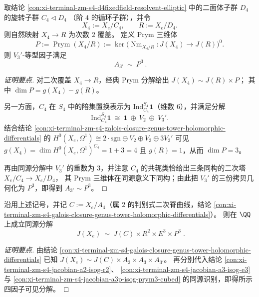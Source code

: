 \begin{conclusion}\label{con:xi-terminal-zm-s4-jacobian-a3p-isog-prym3-cubed}
取结论 \ref{con:xi-terminal-zm-s4-d4fixedfield-resolvent-elliptic} 中的二面体子群 \(D_4\) 的旋转子群
\(
C_4\lhd D_4
\)
（阶 \(4\) 的循环子群），并令
\[
X_4:=X_e/C_4,
\qquad
R:=X_e/D_4.
\]
则自然映射 \(X_4\to R\) 为次数 \(2\) 覆盖。
定义 Prym 三维体
\[
P:=\operatorname{Prym}(X_4/R):=\ker\!\bigl(\operatorname{Nm}_{X_4/R}:J(X_4)\to J(R)\bigr)^{0}.
\]
则 \(V_3'\)-等型因子满足
\[
\boxed{\ A_{3'}\ \sim\ P^{3}\ } .
\]
\end{conclusion}
\begin{proof}[证明要点]
对二次覆盖 \(X_4\to R\)，经典 Prym 分解给出
\(
J(X_4)\sim J(R)\times P
\)；
其中 \(\dim P=g(X_4)-g(R)\)。
\par
另一方面，\(C_4\) 在 \(S_4\) 中的陪集置换表示为 \(\mathrm{Ind}_{C_4}^{S_4}\mathbf{1}\)（维数 \(6\)），并满足分解
\[
\mathrm{Ind}_{C_4}^{S_4}\mathbf{1}\ \cong\ \mathbf{1}\ \oplus\ V_2\ \oplus\ V_3'.
\]
结合结论 \ref{con:xi-terminal-zm-s4-galois-closure-genus-tower-holomorphic-differentials} 的
\(
H^0(X_e,\Omega^1)\cong 2\cdot\mathrm{sgn}\oplus V_2\oplus V_3\oplus 3V_3'
\)
可见
\(
g(X_4)=\dim H^0(X_e,\Omega^1)^{C_4}=1+3=4
\)
且 \(g(R)=1\)，从而 \(\dim P=3\)。
\par
再由同源分解中 \(V_3'\) 的重数为 \(3\)，并注意 \(C_4\) 的共轭类恰给出三条同构的二次塔 \(X_e/C_4\to X_e/D_4\)，
其 Prym 三维体在同源意义下同构；由此把 \(V_3'\) 的三份拷贝几何化为 \(P^3\)，即得到 \(A_{3'}\sim P^3\)。
\end{proof}

\begin{conclusion}\label{con:xi-terminal-zm-s4-jacobian-visible-factorization}
沿用上述记号，并记 \(C:=X_e/A_4\)（属 \(2\) 的判别式二次脊曲线，结论 \ref{con:xi-terminal-zm-s4-galois-closure-genus-tower-holomorphic-differentials}）。
则在 \(\QQ\) 上成立同源分解
\[
\boxed{\;
J(X_e)\ \sim\ J(C)\times R^{2}\times E^{3}\times P^{3}\; }.
\]
\end{conclusion}
\begin{proof}[证明要点]
由结论 \ref{con:xi-terminal-zm-s4-galois-closure-genus-tower-holomorphic-differentials} 已知
\(
J(X_e)\sim J(C)\times A_2\times A_3\times A_{3'}
\)。
再分别代入结论 \ref{con:xi-terminal-zm-s4-jacobian-a2-isog-r2}、
\ref{con:xi-terminal-zm-s4-jacobian-a3-isog-e3} 与
\ref{con:xi-terminal-zm-s4-jacobian-a3p-isog-prym3-cubed} 的同源识别，即得所示四因子可见分解。
\end{proof}

